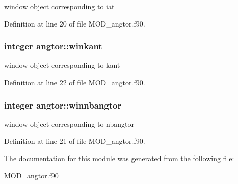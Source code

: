 window object corresponding to iat 



Definition at line 20 of file M\-O\-D\-\_\-angtor.\-f90.

\hypertarget{classangtor_ad7a8d546e4362617e885cbf94df68b73}{
\subsubsection[{winkant}]{\setlength{\rightskip}{0pt plus 5cm}integer angtor\-::winkant}}\label{classangtor_ad7a8d546e4362617e885cbf94df68b73}


window object corresponding to kant 



Definition at line 22 of file M\-O\-D\-\_\-angtor.\-f90.

\hypertarget{classangtor_a31db7ffa69fe06e6bd00f7ea4cccf43c}{
\subsubsection[{winnbangtor}]{\setlength{\rightskip}{0pt plus 5cm}integer angtor\-::winnbangtor}}\label{classangtor_a31db7ffa69fe06e6bd00f7ea4cccf43c}


window object corresponding to nbangtor 



Definition at line 21 of file M\-O\-D\-\_\-angtor.\-f90.



The documentation for this module was generated from the following file\-:\begin{DoxyCompactItemize}
\item 
\hyperlink{MOD__angtor_8f90}{M\-O\-D\-\_\-angtor.\-f90}\end{DoxyCompactItemize}
